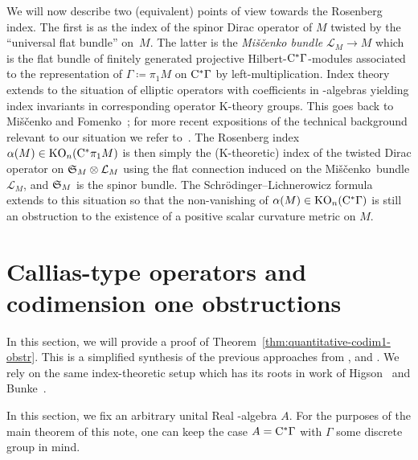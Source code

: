 \documentclass[11pt]{article}
\DeclareMathOperator{\KO}{KO}
\numberwithin{equation}{section}
\newcommand*{\Mishchenko}{Mi\v{s}\v{c}enko}
\begin{document}
We will now describe two (equivalent) points of view towards the Rosenberg index.
The first is as the index of the spinor Dirac operator of \(M\) twisted by the ``universal flat bundle'' on~\(M\).
The latter is the \emph{Mi\v{s}\v{c}enko bundle} \(\mathcal{L}_M \to M\) which is the flat bundle of finitely generated projective Hilbert-\(\mathrm{C}^\ast \Gamma\)-modules associated to the representation of \(\Gamma \coloneqq \pi_1 M\) on \(\mathrm{C}^\ast \Gamma\) by left-multiplication.
Index theory extends to the situation of elliptic operators with coefficients in \textCstar-algebras yielding index invariants in corresponding operator K-theory groups.
This goes back to Mi\v{s}\v{c}enko and Fomenko~\cite{Mishchenko-Fomenko:Index}; for more recent expositions of the technical background relevant to our situation we refer to~\cite{Ebert:EllipticRegularityDirac,HankePapeSchick:CodimensionTwoIndex}.
The Rosenberg index \(\alpha(M) \in \KO_n(\Cstar \pi_1 M)\) is then simply the (K-theoretic) index of the twisted Dirac operator on \(\mathfrak{S}_M \otimes \mathcal{L}_M\) using the flat connection induced on the \Mishchenko\ bundle \(\mathcal{L}_M\), and \(\mathfrak{S}_M\) is the spinor bundle.
The Schr\"odinger--Lichnerowicz formula extends to this situation so that the non-vanishing of \(\alpha(M) \in \KO_n(\Cstar \Gamma)\) is still an obstruction to the existence of a positive scalar curvature metric on \(M\).

\setcounter{section}{2}
\setcounter{subsection}{0}
\setcounter{subsubsection}{0}
\setcounter{Theorem}{4}
\setcounter{equation}{1}
\section{Callias-type operators and codimension one obstructions} \label{sec:codim-1-obstr}
In this section, we will provide a proof of Theorem~\ref{thm:quantitative-codim1-obstr}.
This is a simplified synthesis of the previous approaches from \cite{Cecchini:CalliasTypePSC}, \cite[Section~6]{Cecchini:LongNeck} and \cite[Section~2]{Zeidler:band-width-estimates}.
We rely on the same index-theoretic setup which has its roots in work of Higson~\cite{Higson:CobordismInvariance} and Bunke~\cite{Bunke:RelativeIndexCallias}.

In this section, we fix an arbitrary unital Real \textCstar-algebra \(A\).
For the purposes of the main theorem of this note, one can keep the case \(A = \mathrm{C}^\ast \Gamma\) with \(\Gamma\) some discrete group in mind.
\end{document}
